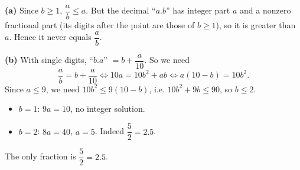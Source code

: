 \textbf{(a)} Since $b\ge1$, $\dfrac ab\le a$. But the decimal ``$a.b$'' has integer part $a$ and a nonzero fractional part (its digits after the point are those of $b\ge1$), so it is greater than $a$. Hence it never equals $\dfrac ab$.

\textbf{(b)} With single digits, ``$b.a$'' $=b+\dfrac{a}{10}$. So we need
\[\dfrac ab=b+\dfrac a{10}\iff10a=10b^2+ab\iff a(10-b)=10b^2.\]
Since $a\le9$, we need $10b^2\le9(10-b)$, i.e. $10b^2+9b\le90$, so $b\le2$.
\begin{itemize}
\item $b=1$: $9a=10$, no integer solution.
\item $b=2$: $8a=40$, $a=5$. Indeed $\dfrac52=2.5$.
\end{itemize}
The only fraction is $\boxed{\dfrac52=2.5}$.

